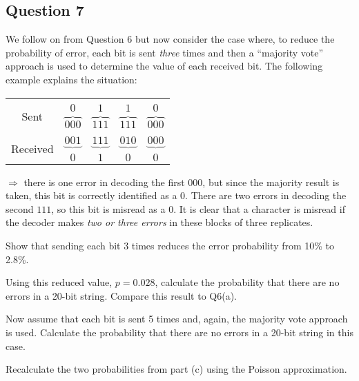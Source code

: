 \subsection*{Question 7}
We follow on from Question 6 but now consider the case where, to reduce the probability of error, each bit is sent \emph{three} times and then a ``majority vote'' approach is used to determine the value of each received bit. The following example explains the situation:\\[-0.5cm]
\begin{center}
	\begin{tabular}{ccccc}
		\hline
		&&&&\\[-0.3cm]
		\multirow{2}{*}{Sent} & $0$ & $1$ & $1$ & $0$ \\
		& $\overbrace{000}$ & $\overbrace{111}$ & $\overbrace{111}$ & $\overbrace{000}$ \\[0.2cm]
		\hline
		&&&&\\[-0.3cm]
		\multirow{2}{*}{Received} & $\underbrace{001}$ & $\underbrace{111}$ & $\underbrace{010}$ & $\underbrace{000}$ \\
		& $0$ & $1$ & $0$ & $0$ \\[0.2cm]
		\hline
	\end{tabular}
\end{center}
$\Rightarrow$ there is one error in decoding the first $000$, but since the majority result is taken, this bit is correctly identified as a $0$. There are two errors in decoding the second $111$, so this bit is misread as a $0$. It is clear that a character is misread if the decoder makes \emph{two or three errors} in these blocks of three replicates.\\[-0.2cm]

\item  Show that sending each bit 3 times reduces the error probability from 10\% to 2.8\%. 
\\ \item  Using this reduced value, $p=0.028$, calculate the probability that there are no errors in a 20-bit string. Compare this result to Q6(a). 
 \item  Now assume that each bit is sent 5 times and, again, the majority vote approach is used. Calculate the probability that there are no errors in a 20-bit string in this case. %
 \item  Recalculate the two probabilities from part (c) using the Poisson approximation.
